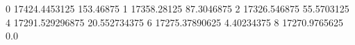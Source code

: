 0 17424.4453125 153.46875
1 17358.28125 87.3046875
2 17326.546875 55.5703125
4 17291.529296875 20.552734375
6 17275.37890625 4.40234375
8 17270.9765625 0.0

